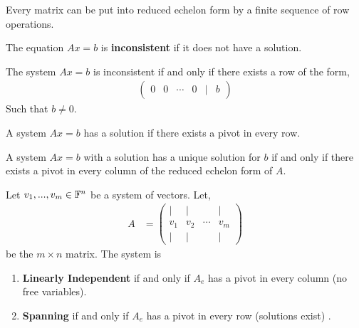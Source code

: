 \begin{thm}
    Every matrix can be put into reduced echelon form by a finite sequence of row operations.
\end{thm}

\begin{definition}
    The equation $Ax = b$ is \textbf{inconsistent} if it does not have a solution.
\end{definition}

\begin{thm}
    The system $Ax = b$ is inconsistent if and only if there exists a row of the form,
    \begin{align*}
        \begin{pmatrix}
            0 & 0 & \cdots & 0 & | & b
        \end{pmatrix}
    \end{align*}
    Such that $b \neq 0$.
\end{thm}

\begin{corollary}
    A system $Ax = b$ has a solution if there exists a pivot in every row.
\end{corollary}

\begin{corollary}
    A system $Ax = b$ with a solution has a unique solution for $b$ if and only if there exists a pivot in every column of the reduced echelon
    form of $A$.
\end{corollary}

\begin{thm}
    Let $v_1, ..., v_m \in \mathbb{F}^n$ be a system of vectors. Let,
    \begin{align*}
        A &= 
        \begin{pmatrix}
            | & | &  & | \\
            v_1 & v_2 & \cdots & v_m \\
            | & | &  & |           
        \end{pmatrix}
    \end{align*}
    be the $m \times n$ matrix. The system is
    \begin{enumerate}
        \item \textbf{Linearly Independent} if and only if $A_e$ has a pivot in every column (no free variables).
        \item \textbf{Spanning} if and only if $A_e$ has a pivot in every row (solutions exist) .
    \end{enumerate}
\end{thm}